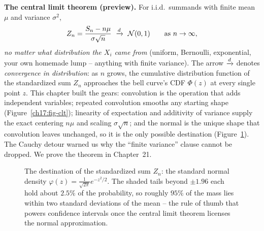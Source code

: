 \begin{aestheticbox}
\textbf{The central limit theorem (preview).} For i.i.d.\ summands with
finite mean $\mu$ and variance $\sigma^2$,
\[
Z_n=\frac{S_n-n\mu}{\sigma\sqrt n}\ \dto\ \Normal(0,1)
\qquad\text{as } n\to\infty,
\]
\emph{no matter what distribution the $X_i$ came from} (uniform, Bernoulli,
exponential, your own homemade lump -- anything with finite variance).
The arrow $\xrightarrow{d}$ denotes \emph{convergence in distribution}: as $n$ grows,
the cumulative distribution function of the standardized sum $Z_n$ approaches
the bell curve's CDF $\Phi(z)$ at every single point $z$.
This chapter built the gears: convolution is the operation that adds
independent variables; repeated convolution smooths any starting shape
(Figure~\ref{ch17:fig-clt}); linearity of expectation and additivity of
variance supply the exact centering $n\mu$ and scaling $\sigma\sqrt n$; and
the normal is the unique shape that convolution leaves unchanged, so it is
the only possible destination (Figure~\ref{ch17:fig-bell}). The Cauchy detour warned us why the
``finite variance'' clause cannot be dropped. We prove the theorem in Chapter~21.
\end{aestheticbox}

\begin{figure}[H]
\centering
{}
\caption{The destination of the standardized sum $Z_n$: the standard normal
density $\varphi(z)=\frac{1}{\sqrt{2\pi}}e^{-z^2/2}$. The shaded tails beyond
$\pm 1.96$ each hold about $2.5\%$ of the probability, so roughly $95\%$ of
the mass lies within two standard deviations of the mean -- the rule of thumb
that powers confidence intervals once the central limit theorem licenses the
normal approximation.}
\label{ch17:fig-bell}
\end{figure}

